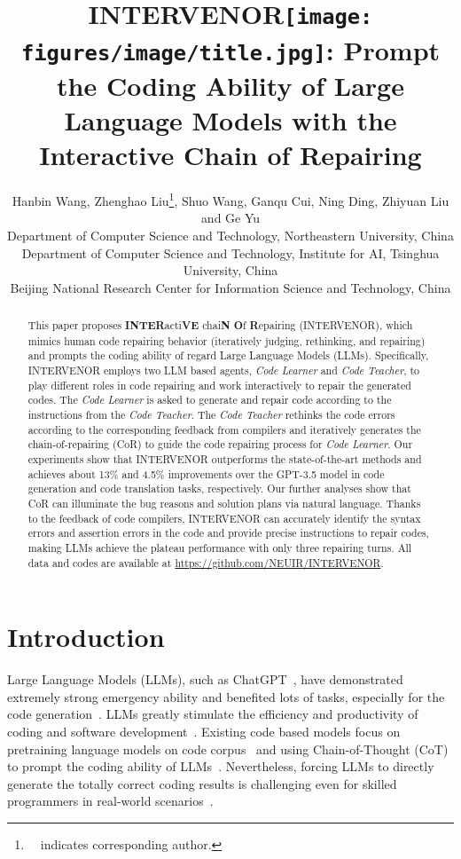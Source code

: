 \documentclass[11pt]{article}
\title{{\bf \textsc{INTERVENOR}\texttt{[image: figures/image/title.jpg]}}: Prompt the Coding Ability of Large Language Models with the Interactive Chain of Repairing}
\author{Hanbin Wang, Zhenghao Liu\thanks{ \ \ indicates corresponding author.}, Shuo Wang, Ganqu Cui, Ning Ding, Zhiyuan Liu and Ge Yu \\ 
Department of Computer Science and Technology, Northeastern University, China \\
Department of Computer Science and Technology, Institute for AI, Tsinghua University, China \\
Beijing National Research Center for Information Science and Technology, China \\
}
\begin{document}
\maketitle
\begin{abstract}
This paper proposes \textbf{INTER}acti\textbf{VE} chai\textbf{N} \textbf{O}f \textbf{R}epairing (INTERVENOR), which mimics human code repairing behavior (iteratively judging, rethinking, and repairing) and prompts the coding ability of regard Large Language Models (LLMs). Specifically, INTERVENOR employs two LLM based agents, \textit{Code Learner} and \textit{Code Teacher}, to play different roles in code repairing and work interactively to repair the generated codes. The \textit{Code Learner} is asked to generate and repair code according to the instructions from the \textit{Code Teacher}. The \textit{Code Teacher} rethinks the code errors according to the corresponding feedback from compilers and iteratively generates the chain-of-repairing (CoR) to guide the code repairing process for \textit{Code Learner}. Our experiments show that INTERVENOR outperforms the state-of-the-art methods and achieves about 13\% and 4.5\% improvements over the GPT-3.5 model in code generation and code translation tasks, respectively. Our further analyses show that CoR can illuminate the bug reasons and solution plans via natural language. Thanks to the feedback of code compilers, INTERVENOR can accurately identify the syntax errors and assertion errors in the code and provide precise instructions to repair codes, making LLMs achieve the plateau performance with only three repairing turns. All data and codes are available at \url{https://github.com/NEUIR/INTERVENOR}.
 \end{abstract}



\section{Introduction}
Large Language Models (LLMs), such as ChatGPT~\cite{chatgpt}, have demonstrated extremely strong emergency ability and benefited lots of tasks, especially for the code generation~\cite{openai2023gpt4,roziere2023code,wang2023codet5+}. LLMs greatly stimulate the efficiency and productivity of coding and software development~\cite{qian2023communicative}. Existing code based models focus on pretraining language models on code corpus~\cite{muennighoff2023octopack,luo2023wizardcoder,li2023starcoder,zheng2023codegeex} and using Chain-of-Thought (CoT) to prompt the coding ability of LLMs~\cite{wei2023chainofthought,huang2023codecot,li2023structured}. Nevertheless, forcing LLMs to directly generate the totally correct coding results is challenging even for skilled programmers in real-world scenarios~\cite{chen2023teaching}.
\end{document}
